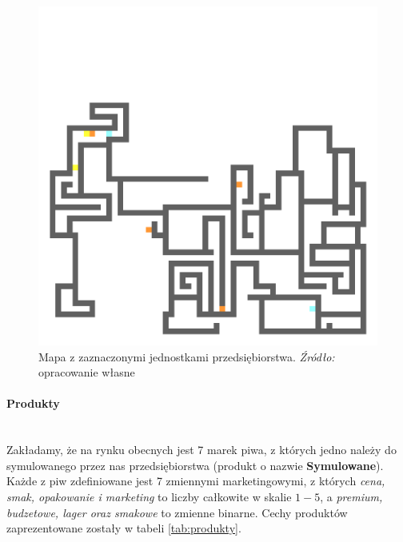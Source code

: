\documentclass[polish, twoside, 12pt, a4paper]{article}
\theoremstyle{definition}
\theoremstyle{plain}
\theoremstyle{remark}
\begin{document}
\begin{figure}[hbt]
  \centering


    \includegraphics[width=\textwidth]{../mapy/firma.png}


  \captionsetup{margin=10pt,font=small,labelfont=bf,width=.8\textwidth}

  \caption[Krótka nazwa X]{Mapa z zaznaczonymi jednostkami przedsiębiorstwa. \textit{Źródło:} opracowanie własne}\label{mapafirma}
\end{figure}

\paragraph{Produkty}\mbox{}\\
Zakładamy, że na rynku obecnych jest 7 marek piwa, z których jedno należy do symulowanego przez nas przedsiębiorstwa (produkt o nazwie \textbf{Symulowane}). Każde z piw zdefiniowane jest 7 zmiennymi marketingowymi, z których \textit{cena, smak, opakowanie i marketing} to liczby całkowite w skalie $1-5$, a \textit{premium, budzetowe, lager oraz smakowe} to zmienne binarne. Cechy produktów zaprezentowane zostały w tabeli \ref{tab:produkty}. 
\end{document}
